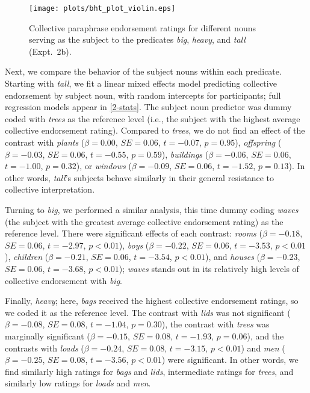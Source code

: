 \documentclass[preprint,12pt,authoryear,titlepage]{elsarticle}
\newcommand{\ndg}[1]{\textcolor{Green}{[ndg: #1]}}
\begin{document}
\begin{figure}[htb]
	\centering
	\texttt{[image: plots/bht\_plot\_violin.eps]}
	\vspace{0pt}
	\caption{Collective paraphrase endorsement ratings for different nouns serving as the subject to the predicates \emph{big}, \emph{heavy}, and \emph{tall} (Expt.~2b).} \label{bhtcoll}
\end{figure}


Next, we compare the behavior of the subject nouns within each predicate.  Starting with \emph{tall}, we fit a linear mixed effects model predicting collective endorsement by subject noun, with random intercepts for participants; full regression models appear in \ref{2-stats}. The subject noun predictor was dummy coded with \emph{trees} as the reference level (i.e., the subject with the highest average collective endorsement rating). Compared to \emph{trees}, we do not find an effect of the contrast with \emph{plants} ($\beta=0.00$, $SE=0.06$, $t=-0.07$, $p=0.95$), \emph{offspring} ($\beta=-0.03$, $SE=0.06$, $t=-0.55$, $p=0.59$), \emph{buildings} ($\beta=-0.06$, $SE=0.06$, $t=-1.00$, $p=0.32$), or \emph{windows} ($\beta=-0.09$, $SE=0.06$, $t=-1.52$, $p=0.13$). In other words, \emph{tall}'s subjects behave similarly in their general resistance to collective interpretation. 

Turning to \emph{big}, we performed a similar analysis, this time dummy coding \emph{waves} (the subject with the greatest average collective endorsement rating) as the reference level. There were significant effects of each contrast: \emph{rooms} ($\beta=-0.18$, $SE=0.06$, $t=-2.97$, $p<0.01$), \emph{boys} ($\beta=-0.22$, $SE=0.06$, $t=-3.53$, $p<0.01$), \emph{children} ($\beta=-0.21$, $SE=0.06$, $t=-3.54$, $p<0.01$), and \emph{houses} ($\beta=-0.23$, $SE=0.06$, $t=-3.68$, $p<0.01$); \emph{waves} stands out in its relatively high levels of collective endorsement with \emph{big}.

Finally, \emph{heavy}; here, \emph{bags} received the highest collective endorsement ratings, so we coded it as the reference level. The contrast with \emph{lids} was not significant ($\beta=-0.08$, $SE=0.08$, $t=-1.04$, $p=0.30$), the contrast with \emph{trees} was marginally significant ($\beta=-0.15$, $SE=0.08$, $t=-1.93$, $p=0.06$), and the contrasts with \emph{loads} ($\beta=-0.24$, $SE=0.08$, $t=-3.15$, $p<0.01$) and \emph{men} ($\beta=-0.25$, $SE=0.08$, $t=-3.56$, $p<0.01$) were significant. In other words, we find similarly high ratings for \emph{bags} and \emph{lids}, intermediate ratings for \emph{trees}, and similarly low ratings for \emph{loads} and \emph{men}.
\end{document}
